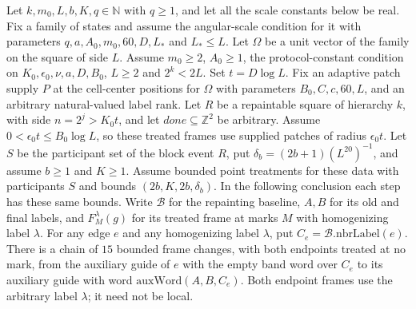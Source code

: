 \begin{lemma}
    \label{thm:peps_protocol_auxiliary_birth_chain}
    \leanok
    Let $k,m_0,L,b,K,q\in\mathbb N$ with $q\ge1$, and let all the scale
    constants below be real. Fix a family of states and assume the angular-scale
    condition for it with parameters $q,a,A_0,m_0,60,D,L_*$ and $L_*\le L$. Let
    $\Omega$ be a unit vector of the family on the square of side $L$. Assume $m_0\ge2$,
    $A_0\ge1$, the protocol-constant condition on $K_0,\epsilon_0,\nu,a,D,B_0$,
    $L\ge2$ and $2^k<2L$. Set $t=D\log L$. Fix an adaptive patch supply
    $P$ at the cell-center positions for $\Omega$ with parameters
    $B_0,C,c,60,L$, and an arbitrary natural-valued label rank.
    Let $R$ be a repaintable square of hierarchy $k$, with side $n=2^j>K_0t$,
    and let $\mathit{done}\subseteq\mathbb Z^2$ be arbitrary. Assume
    $0<\epsilon_0t\le B_0\log L$, so these treated frames use supplied
    patches of radius $\epsilon_0t$.
    Let $S$ be the participant set of the block event $R$, put
    $\delta_b=(2b+1)(L^{20})^{-1}$, and assume $b\ge1$ and $K\ge1$.
    Assume bounded point treatments for these data with participants $S$ and
    bounds $(2b,K,2b,\delta_b)$. In the following conclusion each step has
    these same bounds. Write $\mathcal B$ for the repainting baseline,
    $A,B$ for its old and final labels, and $F_M^\lambda(g)$ for its treated
    frame at marks $M$ with homogenizing label $\lambda$.
    For any edge $e$ and any homogenizing label $\lambda$, put
    $C_e=\mathcal B.\mathrm{nbrLabel}(e)$. There is a chain of $15$ bounded
    frame changes, with both endpoints treated at no mark, from the auxiliary
    guide of $e$ with the empty band word over $C_e$ to its auxiliary guide with
    word $\mathrm{auxWord}(A,B,C_e)$. Both endpoint frames use the arbitrary
    label $\lambda$; it need not be local.
\end{lemma}

